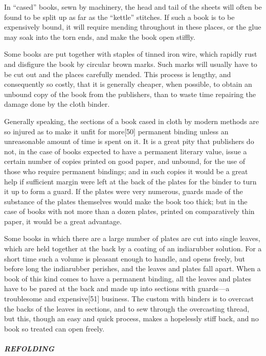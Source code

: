 \documentclass[
]{article}
\begin{document}
In ``cased'' books, sewn by machinery, the head and tail of the sheets
will often be found to be split up as far as the ``kettle'' stitches. If
such a book is to be expensively bound, it will require mending
throughout in these places, or the glue may soak into the torn ends, and
make the book open stiffly.

Some books are put together with staples of tinned iron wire, which
rapidly rust and disfigure the book by circular brown marks. Such marks
will usually have to be cut out and the places carefully mended. This
process is lengthy, and consequently so costly, that it is generally
cheaper, when possible, to obtain an unbound copy of the book from the
publishers, than to waste time repairing the damage done by the cloth
binder.

Generally speaking, the sections of a book cased in cloth by modern
methods are so injured as to make it unfit for
more{\protect\hypertarget{Page_50}{}{{[}50{]}}} permanent binding unless
an unreasonable amount of time is spent on it. It is a great pity that
publishers do not, in the case of books expected to have a permanent
literary value, issue a certain number of copies printed on good paper,
and unbound, for the use of those who require permanent bindings; and in
such copies it would be a great help if sufficient margin were left at
the back of the plates for the binder to turn it up to form a guard. If
the plates were very numerous, guards made of the substance of the
plates themselves would make the book too thick; but in the case of
books with not more than a dozen plates, printed on comparatively thin
paper, it would be a great advantage.

Some books in which there are a large number of plates are cut into
single leaves, which are held together at the back by a coating of an
indiarubber solution. For a short time such a volume is pleasant enough
to handle, and opens freely, but before long the indiarubber perishes,
and the leaves and plates fall apart. When a book of this kind comes to
have a permanent binding, all the leaves and plates have to be pared at
the back and made up into sections with guards---a troublesome and
expensive{\protect\hypertarget{Page_51}{}{{[}51{]}}} business. The
custom with binders is to overcast the backs of the leaves in sections,
and to sew through the overcasting thread, but this, though an easy and
quick process, makes a hopelessly stiff back, and no book so treated can
open freely.

\hypertarget{refolding}{%
\subparagraph{REFOLDING}\label{refolding}}
\end{document}
